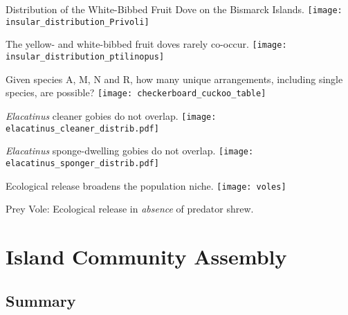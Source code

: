 \documentclass[xcolor=svgnames]{beamer}
\begin{document}
\begin{frame}{Distribution of the White-Bibbed Fruit Dove on the Bismarck Islands.}
	\centering
		\texttt{[image: insular\_distribution\_Privoli]}\\
\end{frame}

\begin{frame}{The yellow- and white-bibbed fruit doves rarely co-occur.}
	\centering
		\texttt{[image: insular\_distribution\_ptilinopus]}\\
\end{frame}

\begin{frame}{Given species A, M, N and R, how many unique arrangements, including single species, are possible?}
	\pause
	\centering
		\texttt{[image: checkerboard\_cuckoo\_table]}\\
\end{frame}

\begin{frame}{\textit{Elacatinus} cleaner gobies do not overlap.}
	\centering
		\texttt{[image: elacatinus\_cleaner\_distrib.pdf]}\\
\end{frame}

\begin{frame}{\textit{Elacatinus} sponge-dwelling gobies do not overlap.}
	\centering
		\texttt{[image: elacatinus\_sponger\_distrib.pdf]}\\
\end{frame}

\begin{frame}{Ecological release broadens the population niche.}
	\centering
		\texttt{[image: voles]}\\
	\begin{block}{}
		Prey Vole: Ecological release in \textit{absence} of predator shrew.\\
	\end{block}
\end{frame}


\section{Island Community Assembly}
\subsection{Summary}
\end{document}
